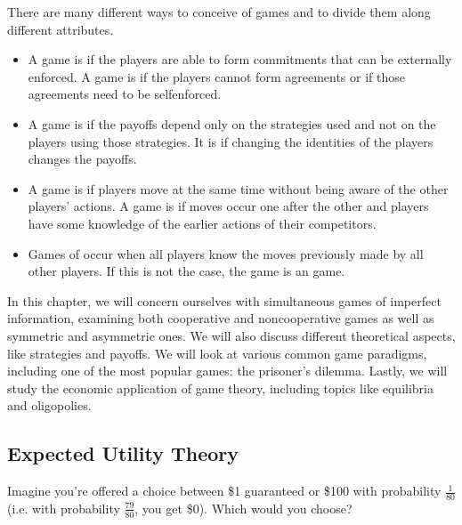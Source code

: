 \documentclass[letterpaper,10pt,english]{jupyterBook}
\begin{document}
\sphinxAtStartPar
There are many different ways to conceive of games and to divide them along different attributes.
\begin{itemize}
\item {} 
\sphinxAtStartPar
{} A game is  if the players are able to form commitments that can be externally enforced. A game is  if the players cannot form agreements or if those agreements need to be self\sphinxhyphen{}enforced.

\item {} 
\sphinxAtStartPar
{} A game is  if the payoffs depend only on the strategies used and not on the players using those strategies. It is  if changing the identities of the players changes the payoffs.

\item {} 
\sphinxAtStartPar
{} A game is  if players move at the same time without being aware of the other players’ actions. A game is  if moves occur one after the other and players have some knowledge of the earlier actions of their competitors.

\item {} 
\sphinxAtStartPar
{} Games of  occur when all players know the moves previously made by all other players. If this is not the case, the game is an  game.

\end{itemize}

\sphinxAtStartPar
In this chapter, we will concern ourselves with simultaneous games of imperfect information, examining both cooperative and non\sphinxhyphen{}cooperative games as well as symmetric and asymmetric ones. We will also discuss different theoretical aspects, like strategies and payoffs. We will look at various common game paradigms, including one of the most popular games: the prisoner’s dilemma. Lastly, we will study the economic application of game theory, including topics like equilibria and oligopolies.


\subsection{Expected Utility Theory}
\label{\detokenize{content/07-game-theory/expected-utility:expected-utility-theory}}\label{\detokenize{content/07-game-theory/expected-utility::doc}}
\sphinxAtStartPar
Imagine you’re offered a choice between \$1 guaranteed or \$100 with probability \(\frac{1}{80}\) (i.e. with probability \(\frac{79}{80}\), you get \$0). Which would you choose?
\end{document}
